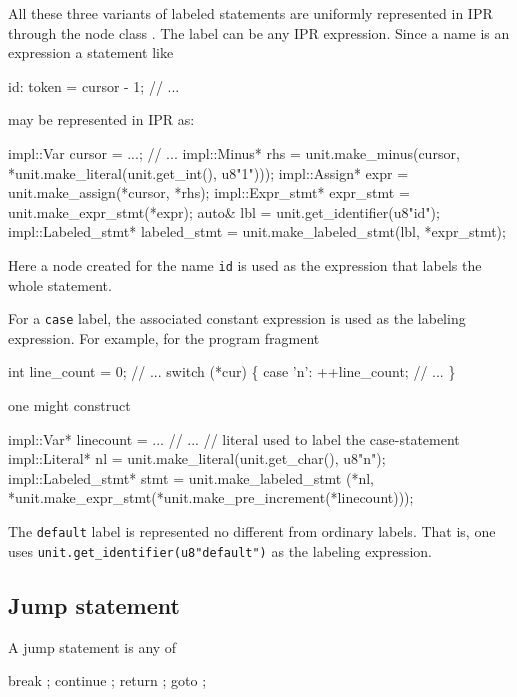 \documentclass[11pt]{article}
\begin{document}
All these three variants of labeled statements are uniformly represented in
IPR through the node class .  The label can be any
IPR expression.  Since a name is an expression a statement like 
\begin{Program}
  id:
     token = cursor - 1;
     // ...
\end{Program}
may be represented in IPR as:
\begin{Program}
  impl::Var cursor = ...;
  // ...
  impl::Minus* rhs = unit.make_minus(cursor, 
                                     *unit.make_literal(unit.get_int(), u8"1")));
  impl::Assign* expr = unit.make_assign(*cursor, *rhs);
  impl::Expr_stmt* expr_stmt = unit.make_expr_stmt(*expr);
  auto& lbl = unit.get_identifier(u8"id");
  impl::Labeled_stmt* labeled_stmt = unit.make_labeled_stmt(lbl, *expr_stmt);
\end{Program}
Here a node created for the name \texttt{id} is used as the expression
that labels the whole statement.

For a \texttt{case} label, the associated constant expression is used as the
labeling expression.  For example, for the program fragment
\begin{Program}
  int line_count = 0;
  // ...
  switch (*cur) \{
    case '{\bslash}n':
       ++line_count;
       // ...
  \}
\end{Program}
one might construct
\begin{Program}
  impl::Var* linecount = ...
  // ...
  // literal used to label the case-statement
  impl::Literal* nl = unit.make_literal(unit.get_char(), u8"{\bslash\bslash}n");
  impl::Labeled_stmt* stmt = unit.make_labeled_stmt
     (*nl, *unit.make_expr_stmt(*unit.make_pre_increment(*linecount)));
\end{Program}

The \texttt{default} label is represented no different from ordinary labels.
That is, one uses \verb=unit.get_identifier(u8"default")= as the labeling
expression. 


\subsection{Jump statement}
\label{sec:stmt.jump}

A jump statement is any of
\begin{Grammar}
      break ;
      continue ;
      return  ;
      goto  ;
\end{Grammar}
\end{document}
